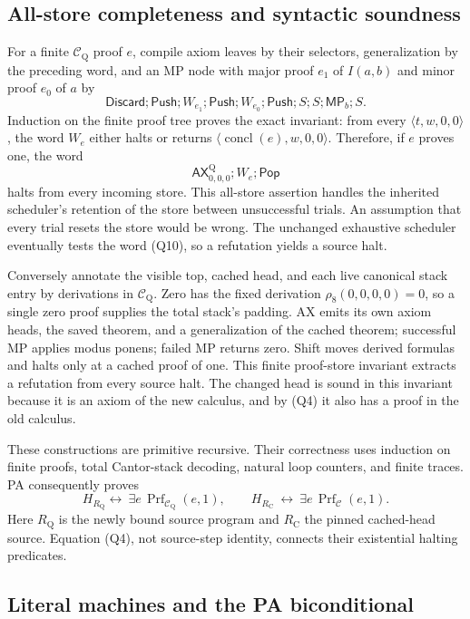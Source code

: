 \subsection{All-store completeness and syntactic soundness}

For a finite $\mathcal C_{\mathrm Q}$ proof $e$, compile axiom leaves
by their selectors, generalization by the preceding word, and an MP
node with major proof $e_1$ of $I(a,b)$ and minor proof $e_0$ of $a$ by
\[
 \mathsf{Discard};\mathsf{Push};W_{e_1};\mathsf{Push};
 W_{e_0};\mathsf{Push};S;S;\mathsf{MP}_b;S.
\]
Induction on the finite proof tree proves the exact invariant:
from every $\langle t,w,0,0\rangle$, the word $W_e$ either halts
or returns $\langle\operatorname{concl}(e),w,0,0\rangle$.
Therefore, if $e$ proves one, the word
\[
       \mathsf{AX}^{\mathrm Q}_{0,0,0};W_e;\mathsf{Pop}
\tag{Q10}
\]
halts from every incoming store. This all-store assertion handles the
inherited scheduler's retention of the store between unsuccessful
trials. An assumption that every trial resets the store would be wrong.
The unchanged exhaustive scheduler eventually tests the word (Q10),
so a refutation yields a source halt.

Conversely annotate the visible top, cached head, and each live
canonical stack entry by derivations in $\mathcal C_{\mathrm Q}$.
Zero has the fixed derivation $\rho_8(0,0,0,0)=0$, so a single
zero proof supplies the total stack's padding. AX emits its own axiom
heads, the saved theorem, and a generalization of the cached theorem;
successful MP applies modus ponens; failed MP returns zero.
Shift moves derived formulas and halts only at a cached proof of one.
This finite proof-store invariant extracts a refutation from every
source halt. The changed head is sound in this invariant because it
is an axiom of the new calculus, and by (Q4) it also has a proof in
the old calculus.

These constructions are primitive recursive. Their correctness uses
induction on finite proofs, total Cantor-stack decoding, natural loop
counters, and finite traces. PA consequently proves
\[
 H_{R_{\mathrm Q}} \leftrightarrow\
   \exists e\,\operatorname{Prf}_{\mathcal C_{\mathrm Q}}(e,1),
 \qquad
 H_{R_{\mathrm C}}\ \leftrightarrow\
   \exists e\,\operatorname{Prf}_{\mathcal C}(e,1).
\tag{Q11}
\]
Here $R_{\mathrm Q}$ is the newly bound source program and
$R_{\mathrm C}$ the pinned cached-head source. Equation (Q4),
not source-step identity, connects their existential halting predicates.

\subsection{Literal machines and the PA biconditional}

